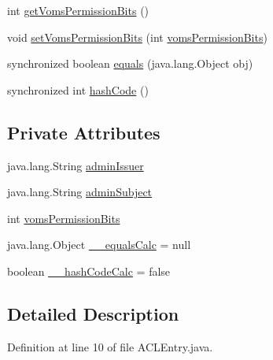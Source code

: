 \begin{DoxyCompactItemize}
int \hyperlink{classorg_1_1glite_1_1security_1_1voms_1_1service_1_1acl_1_1ACLEntry_a6f301c5cf487585c5b3be40fc87636b4}{getVomsPermissionBits} ()
\item 
void \hyperlink{classorg_1_1glite_1_1security_1_1voms_1_1service_1_1acl_1_1ACLEntry_a51f4e09fe9887b5da2aafb7c9b40cfea}{setVomsPermissionBits} (int \hyperlink{classorg_1_1glite_1_1security_1_1voms_1_1service_1_1acl_1_1ACLEntry_a77063368e74f27cc20884c2fd33448c4}{vomsPermissionBits})
\item 
synchronized boolean \hyperlink{classorg_1_1glite_1_1security_1_1voms_1_1service_1_1acl_1_1ACLEntry_a6590a54edcdaba95903e7a29a2242b00}{equals} (java.lang.Object obj)
\item 
synchronized int \hyperlink{classorg_1_1glite_1_1security_1_1voms_1_1service_1_1acl_1_1ACLEntry_a64a2bdc5b0c6b2d40afc6a08b15e1988}{hashCode} ()
\end{DoxyCompactItemize}
\subsection*{Private Attributes}
\begin{DoxyCompactItemize}
\item 
java.lang.String \hyperlink{classorg_1_1glite_1_1security_1_1voms_1_1service_1_1acl_1_1ACLEntry_a04aa947f12248d78c84c941ef8cb8ab4}{adminIssuer}
\item 
java.lang.String \hyperlink{classorg_1_1glite_1_1security_1_1voms_1_1service_1_1acl_1_1ACLEntry_aa6011ea36c14ef998ec1966ee7188c2f}{adminSubject}
\item 
int \hyperlink{classorg_1_1glite_1_1security_1_1voms_1_1service_1_1acl_1_1ACLEntry_a77063368e74f27cc20884c2fd33448c4}{vomsPermissionBits}
\item 
java.lang.Object \hyperlink{classorg_1_1glite_1_1security_1_1voms_1_1service_1_1acl_1_1ACLEntry_adc2f46e0774a81b353d20519a2864184}{\_\-\_\-equalsCalc} = null
\item 
boolean \hyperlink{classorg_1_1glite_1_1security_1_1voms_1_1service_1_1acl_1_1ACLEntry_a34984bc632d0e0119c52d047bc583c02}{\_\-\_\-hashCodeCalc} = false
\end{DoxyCompactItemize}


\subsection{Detailed Description}


Definition at line 10 of file ACLEntry.java.



